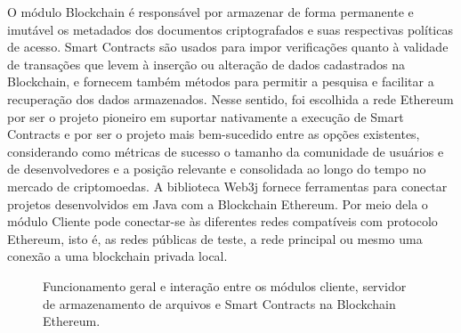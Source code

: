 \documentclass[a4paper,11pt]{article}
\begin{document}

O módulo Blockchain é responsável por armazenar de forma permanente e imutável {\color{blue}os metadados} dos documentos criptografados e suas respectivas políticas de acesso.
Smart Contracts são usados para impor verificações quanto à validade de transações que levem à inserção ou alteração de dados cadastrados na Blockchain, e fornecem também métodos para permitir a pesquisa e facilitar a recuperação dos dados armazenados.
Nesse sentido, foi escolhida a rede Ethereum por ser o projeto pioneiro em suportar nativamente a execução de Smart Contracts e por ser o projeto mais bem-sucedido entre as opções existentes, considerando como métricas de sucesso o tamanho da comunidade de usuários e de desenvolvedores e a posição relevante e consolidada ao longo do tempo no mercado de criptomoedas. %
A biblioteca Web3j fornece ferramentas para conectar projetos desenvolvidos em Java com a Blockchain Ethereum.
Por meio dela o módulo Cliente pode conectar-se às diferentes redes compatíveis com protocolo Ethereum, isto é, as redes públicas de teste, a rede principal ou mesmo uma conexão a uma blockchain privada local. %


\begin{figure}[H]
  \centering
  
  \caption{Funcionamento geral e interação entre os módulos cliente, servidor de armazenamento de arquivos e Smart Contracts na Blockchain Ethereum.}
  \label{fig:diagramaSmartDCPABE}
\end{figure}
\end{document}

